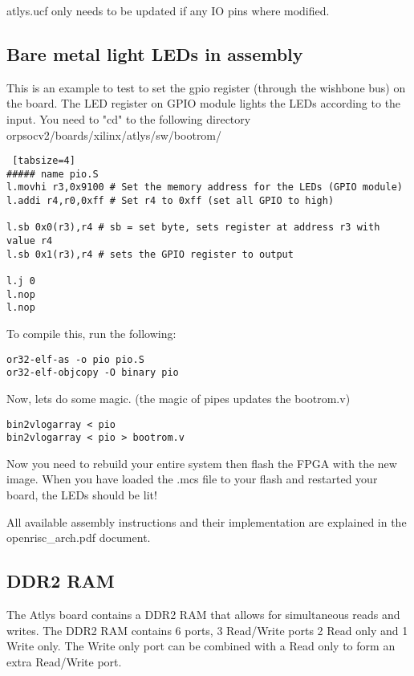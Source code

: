 \documentclass[10pt,a4paper]{article}
\begin{document}
atlys.ucf only needs to be updated if any IO pins where modified.


\subsection{Bare metal light LEDs in assembly}
This is an example to test to set the gpio register (through the wishbone bus) on the board.
The LED register on GPIO module lights the LEDs according to the input.
You need to "cd" to the following directory orpsocv2/boards/xilinx/atlys/sw/bootrom/
\begin{lstlisting} [tabsize=4]
##### name pio.S
l.movhi r3,0x9100 # Set the memory address for the LEDs (GPIO module)
l.addi r4,r0,0xff # Set r4 to 0xff (set all GPIO to high)
 
l.sb 0x0(r3),r4 # sb = set byte, sets register at address r3 with value r4
l.sb 0x1(r3),r4 # sets the GPIO register to output
 
l.j 0
l.nop
l.nop
\end{lstlisting}

To compile this, run the following:
\begin{lstlisting}
or32-elf-as -o pio pio.S
or32-elf-objcopy -O binary pio
\end{lstlisting}
Now, lets do some magic. (the magic of pipes updates the bootrom.v)
\begin{lstlisting}
bin2vlogarray < pio
bin2vlogarray < pio > bootrom.v
\end{lstlisting}
Now you need to rebuild your entire system then flash the FPGA with the new image.
When you have loaded the .mcs file to your flash and restarted your board, the LEDs should be lit!

All available assembly instructions and their implementation are explained in the openrisc\_arch.pdf document.

\subsection{DDR2 RAM}
The Atlys board contains a DDR2 RAM that allows for simultaneous reads and writes.
The DDR2 RAM contains 6 ports, 3 Read/Write ports 2 Read only and 1 Write only.
The Write only port can be combined with a Read only to form an extra Read/Write port. 
\end{document}
